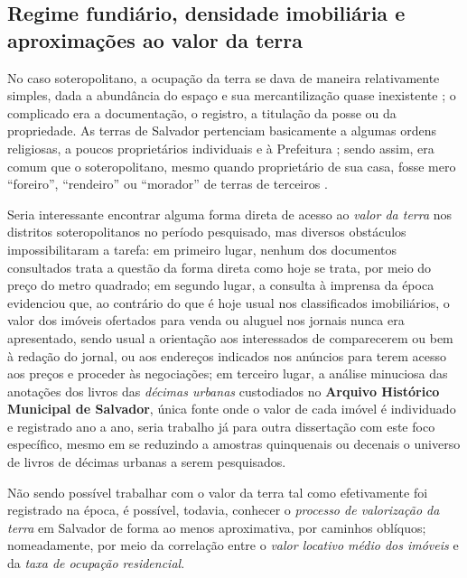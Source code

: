 \subsection{Regime fundiário, densidade imobiliária e aproximações ao valor da terra}\label{subsubsec:polfundvalter}

No caso soteropolitano, a ocupação da terra se dava de maneira relativamente simples, dada a abundância do espaço e sua mercantilização quase inexistente \cite[p.~25]{MOURA1990}; o complicado era a documentação, o registro, a titulação da posse ou da propriedade. As terras de Salvador pertenciam basicamente a algumas ordens religiosas, a poucos proprietários individuais e à Prefeitura \cite{CEDURB1978}; sendo assim, era comum que o soteropolitano, mesmo quando proprietário de sua casa, fosse mero ``foreiro'', ``rendeiro'' ou ``morador'' de terras de terceiros \cite[p.~139]{BRANDAO1980}. 

Seria interessante encontrar alguma forma direta de acesso ao \textit{valor da terra} nos distritos soteropolitanos no período pesquisado, mas diversos obstáculos impossibilitaram a tarefa: em primeiro lugar, nenhum dos documentos consultados trata a questão da forma direta como hoje se trata, por meio do preço do metro quadrado; em segundo lugar, a consulta à imprensa da época evidenciou que, ao contrário do que é hoje usual nos classificados imobiliários, o valor dos imóveis ofertados para venda ou aluguel nos jornais nunca era apresentado, sendo usual a orientação aos interessados de comparecerem ou bem à redação do jornal, ou aos endereços indicados nos anúncios para terem acesso aos preços e proceder às negociações; em terceiro lugar, a análise minuciosa das anotações dos livros das \textit{décimas urbanas} custodiados no \textbf{Arquivo Histórico Municipal de Salvador}, única fonte onde o valor de cada imóvel é individuado e registrado ano a ano, seria trabalho já para outra dissertação com este foco específico, mesmo em se reduzindo a amostras quinquenais ou decenais o universo de livros de décimas urbanas a serem pesquisados.

Não sendo possível trabalhar com o valor da terra tal como efetivamente foi registrado na época, é possível, todavia, conhecer o \textit{processo de valorização da terra} em Salvador de forma ao menos aproximativa, por caminhos oblíquos; nomeadamente, por meio da correlação entre o \textit{valor locativo médio dos imóveis} e da \textit{taxa de ocupação residencial}.

